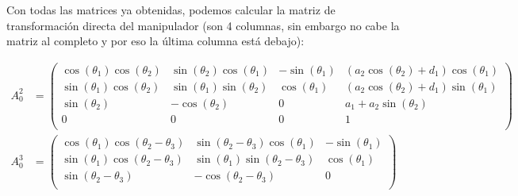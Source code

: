 \documentclass[a4paper,12pt]{article}
\begin{document}
Con todas las matrices ya obtenidas, podemos calcular la matriz de
transformación directa del manipulador (son 4 columnas, sin embargo no cabe la matriz al completo y por eso la última columna está debajo):

{\footnotesize\begin{align*}
    A_0^2 & =
    \begin{pmatrix}
        \cos{\left(\theta_{1} \right)} \cos{\left(\theta_{2} \right)} & \sin{\left(\theta_{2} \right)} \cos{\left(\theta_{1} \right)} & - \sin{\left(\theta_{1} \right)} & \left(a_{2} \cos{\left(\theta_{2} \right)} + d_{1}\right) \cos{\left(\theta_{1} \right)} \\
        \sin{\left(\theta_{1} \right)} \cos{\left(\theta_{2} \right)} & \sin{\left(\theta_{1} \right)} \sin{\left(\theta_{2} \right)} & \cos{\left(\theta_{1} \right)}   & \left(a_{2} \cos{\left(\theta_{2} \right)} + d_{1}\right) \sin{\left(\theta_{1} \right)} \\
        \sin{\left(\theta_{2} \right)}                                & - \cos{\left(\theta_{2} \right)}                              & 0                                & a_{1} + a_{2} \sin{\left(\theta_{2} \right)}                                             \\
        0                                                             & 0                                                             & 0                                & 1                                                                                        \\
    \end{pmatrix} \\
    A_0^3 & =
    \begin{pmatrix}
        \cos{\left(\theta_{1} \right)} \cos{\left(\theta_{2} - \theta_{3} \right)} & \sin{\left(\theta_{2} - \theta_{3} \right)} \cos{\left(\theta_{1} \right)}                                                                          & - \sin{\left(\theta_{1} \right)} \\
        \sin{\left(\theta_{1} \right)} \cos{\left(\theta_{2} - \theta_{3} \right)} & \sin{\left(\theta_{1} \right)} \sin{\left(\theta_{2} - \theta_{3} \right)}                                                                          & \cos{\left(\theta_{1} \right)}   \\
        \sin{\left(\theta_{2} - \theta_{3} \right)}                                & - \cos{\left(\theta_{2} - \theta_{3} \right)}                                                                                                       & 0                                \\

\end{pmatrix}
\end{align*}}
\end{document}
